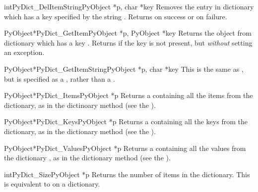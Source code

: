 \documentclass{manual}
\begin{document}
\begin{cfuncdesc}{int}{PyDict_DelItemString}{PyObject *p, char *key}
Removes the entry in dictionary  which has a key
specified by the string .
Returns  on success or  on failure.
\end{cfuncdesc}

\begin{cfuncdesc}{PyObject*}{PyDict_GetItem}{PyObject *p, PyObject *key}
Returns the object from dictionary  which has a key
.  Returns \NULL{} if the key  is not present, but
\emph{without} setting an exception.
\end{cfuncdesc}

\begin{cfuncdesc}{PyObject*}{PyDict_GetItemString}{PyObject *p, char *key}
This is the same as , but  is
specified as a , rather than a .
\end{cfuncdesc}

\begin{cfuncdesc}{PyObject*}{PyDict_Items}{PyObject *p}
Returns a  containing all the items 
from the dictionary, as in the dictinoary method  (see
the ).
\end{cfuncdesc}

\begin{cfuncdesc}{PyObject*}{PyDict_Keys}{PyObject *p}
Returns a  containing all the keys 
from the dictionary, as in the dictionary method  (see the
).
\end{cfuncdesc}

\begin{cfuncdesc}{PyObject*}{PyDict_Values}{PyObject *p}
Returns a  containing all the values 
from the dictionary , as in the dictionary method
 (see the ).
\end{cfuncdesc}

\begin{cfuncdesc}{int}{PyDict_Size}{PyObject *p}
Returns the number of items in the dictionary.  This is equivalent to
 on a dictionary.
\end{cfuncdesc}
\end{document}
